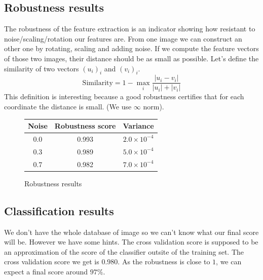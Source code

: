 \documentclass[a4paper, 11pt]{article}
\begin{document}
\subsection{Robustness results}
The robustness of the feature extraction is an indicator showing how resistant to noise/scaling/rotation our features are. From one image we can construct an other one by rotating, scaling and adding noise. If we compute the feature vectors of those two images, their distance should be as small as possible. Let's define the similarity of two vectors $(u_i)_i$ and $(v_i)_i$.
\[\text{Similarity} = 1 - \max_i \frac{|u_i - v_i|}{|u_i| + |v_i|}\]
This definition is interesting because a good robustness certifies that for each coordinate the distance is small. (We use $\infty$ norm).
\begin{figure}[h!]
\centering
\begin{tabular}{|c|c|c|}
\hline
Noise & Robustness score & Variance \\
\hline
0.0 & 0.993 & $2.0 \times 10^{-4}$ \\
0.3 & 0.989 & $5.0 \times 10^{-4}$ \\
0.7 & 0.982 & $7.0 \times 10^{-4}$ \\
\hline
\end{tabular}
\caption{Robustness results}
\end{figure}

\subsection{Classification results}

We don't have the whole database of image so we can't know what our final score will be. However we have some hints. The cross validation score is supposed to be an approximation of the score of the classifier outsite of the training set. The cross validation score we get is $0.980$. As the robustness is close to $1$, we can expect a final score around $97\%$.
\end{document}
